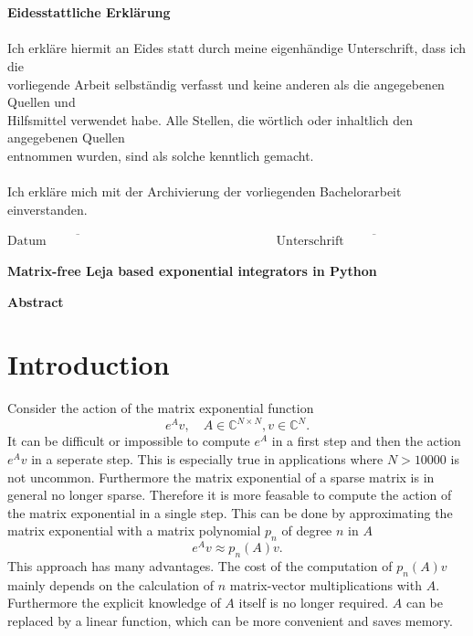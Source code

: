 \documentclass{scrartcl}
\begin{document}
{\begin{figure}[!htp]
\begin{flushright}
\end{flushright}
\end{figure}\\\\
{\Large\textbf{Eidesstattliche Erklärung}}\\\\
Ich erkläre hiermit an Eides statt durch meine eigenhändige Unterschrift, dass ich die\\ vorliegende Arbeit selbständig verfasst und keine anderen als die angegebenen Quellen und\\ Hilfsmittel verwendet habe. Alle Stellen, die wörtlich oder inhaltlich den angegebenen Quellen \\entnommen wurden, sind als solche kenntlich gemacht.\\\\
Ich erkläre mich mit der Archivierung der vorliegenden Bachelorarbeit einverstanden.
\vspace{40pt}\\
\begin{center}
\ensuremath{\overline{\mbox{Datum}\hspace{8em}}
    \hspace{10em}
    \overline{\mbox{Unterschrift}\hspace{10em}}
}
\thispagestyle{empty}
\end{center}}
\pagebreak



\begin{center}\textbf{\Huge Matrix-free Leja based exponential integrators in Python}\end{center}
\begin{center}\textbf{Abstract}\end{center}
\begin{abstract}

\end{abstract}

\setcounter{page}{1}

\section{Introduction}
Consider the action of the matrix exponential function 
	\[e^Av,\quad A\in\mathbb{C}^{N\times N}, v\in\mathbb{C}^N.\] 
It can be difficult or impossible to compute $e^A$ in a first step and then the action $e^Av$ in a seperate step. This is especially true in applications where $N>10000$ is not uncommon. Furthermore the matrix exponential of a sparse matrix is in general no longer sparse. Therefore it is more feasable to compute the action of the matrix exponential in a single step. This can be done by approximating the matrix exponential with a matrix polynomial $p_n$ of degree $n$ in $A$
	\[e^Av \approx p_n(A)v.\]
This approach has many advantages. The cost of the computation of $p_n(A)v$ mainly depends on the calculation of $n$ matrix-vector multiplications with $A$. Furthermore the explicit knowledge of $A$ itself is no longer required. $A$ can be replaced by a linear function, which can be more convenient and saves memory.
\end{document}
